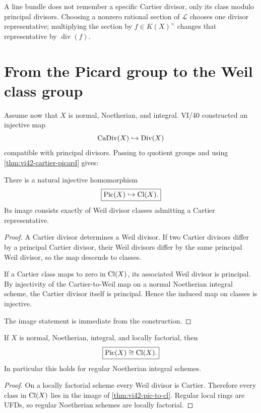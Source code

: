 \begin{remark}
A line bundle does not remember a specific Cartier divisor, only its class modulo principal divisors.  Choosing a nonzero rational section of \(\mathcal L\) chooses one divisor representative; multiplying the section by \(f\in K(X)^\times\) changes that representative by \(\operatorname{div}(f)\).
\end{remark}

\section{From the Picard group to the Weil class group}

Assume now that \(X\) is normal, Noetherian, and integral.  VI/40 constructed an injective map
\[
  \operatorname{CaDiv}(X)\hookrightarrow\operatorname{Div}(X)
\]
compatible with principal divisors.  Passing to quotient groups and using \cref{thm:vi42-cartier-picard} gives:

\begin{theorem}\label{thm:vi42-pic-to-cl}
There is a natural injective homomorphism
\[
  \boxed{
  \operatorname{Pic}(X)\hookrightarrow\operatorname{Cl}(X).
  }
\]
Its image consists exactly of Weil divisor classes admitting a Cartier representative.
\end{theorem}

\begin{proof}
A Cartier divisor determines a Weil divisor.  If two Cartier divisors differ by a principal Cartier divisor, their Weil divisors differ by the same principal Weil divisor, so the map descends to classes.

If a Cartier class maps to zero in \(\operatorname{Cl}(X)\), its associated Weil divisor is principal.  By injectivity of the Cartier-to-Weil map on a normal Noetherian integral scheme, the Cartier divisor itself is principal.  Hence the induced map on classes is injective.

The image statement is immediate from the construction.
\end{proof}

\begin{corollary}\label{cor:vi42-locally-factorial}
If \(X\) is normal, Noetherian, integral, and locally factorial, then
\[
  \boxed{\operatorname{Pic}(X)\cong\operatorname{Cl}(X).}
\]
In particular this holds for regular Noetherian integral schemes.
\end{corollary}

\begin{proof}
On a locally factorial scheme every Weil divisor is Cartier.  Therefore every class in \(\operatorname{Cl}(X)\) lies in the image of \cref{thm:vi42-pic-to-cl}.  Regular local rings are UFDs, so regular Noetherian schemes are locally factorial.
\end{proof}

